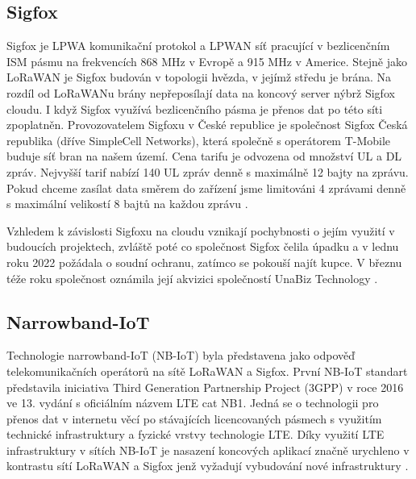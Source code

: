 \subsection{Sigfox}
\par Sigfox je LPWA komunikační protokol a LPWAN síť pracující v bezlicenčním \acs{ISM} pásmu na frekvencích 868 MHz v Evropě a 915 MHz v Americe. Stejně jako \acs{LoRaWAN} je Sigfox budován v topologii hvězda, v jejímž středu je brána. Na rozdíl od LoRaWANu brány nepřeposílají data na koncový server nýbrž Sigfox cloudu.  I když Sigfox využívá bezlicenčního pásma je přenos dat po této síti zpoplatněn. Provozovatelem Sigfoxu v České republice je společnost Sigfox Česká republika (dříve SimpleCell Networks), která společně s operátorem T-Mobile buduje síť bran na našem území. Cena tarifu je odvozena od množství \acs{UL} a \acs{DL} zpráv. Nejvyšší tarif nabízí 140 \acs{UL} zpráv denně s maximálně 12 bajty na zprávu. Pokud chceme zasílat data směrem do zařízení jsme limitováni 4 zprávami denně s maximální velikostí 8 bajtů na každou zprávu \cite{FM8jojRfULuDpOXz}.
\par Vzhledem k závislosti Sigfoxu na cloudu vznikají pochybnosti o jejím využití v budoucích projektech, zvláště poté co společnost Sigfox čelila úpadku a v lednu roku 2022 požádala o soudní ochranu, zatímco se pokouší najít kupce. V březnu téže roku společnost oznámila její akvizici společností UnaBiz Technology \cite{Sedlak3112022, Swinhoe23032022}.

\subsection{Narrowband-IoT}
\par Technologie narrowband-IoT (NB-IoT) byla představena jako odpověď telekomunikačních operátorů na sítě \acs{LoRaWAN} a Sigfox. První \acs{NB-IoT} standart představila iniciativa Third Generation Partnership Project (3GPP) v roce 2016 ve 13. vydání s oficiálním názvem \acs{LTE} cat NB1. Jedná se o technologii pro přenos dat v internetu věcí po stávajících licencovaných pásmech s využitím technické infrastruktury a fyzické vrstvy technologie LTE. Díky využití \acs{LTE} infrastruktury v sítích \acs{NB-IoT} je nasazení koncových aplikací značně urychleno v kontrastu sítí \acs{LoRaWAN} a Sigfox jenž vyžadují vybudování nové infrastruktury \cite{Mozny2019, tBSoZdNaMrfO37cI, Pech20192, K5NubB0NtDsrG3dJ}. 

